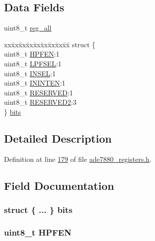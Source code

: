 \subsection*{Data Fields}
\begin{DoxyCompactItemize}
\item 
uint8\-\_\-t \hyperlink{a00023_ab2957613fa7f241407cc98e80676dccf}{reg\-\_\-all}
\item 
\begin{tabbing}
xx\=xx\=xx\=xx\=xx\=xx\=xx\=xx\=xx\=\kill
struct \{\\
\>uint8\_t \hyperlink{a00023_a39a562511dffd499848cfe8bc206364e}{HPFEN}:1\\
\>uint8\_t \hyperlink{a00023_ac6b65abbac3f8c1f93faa0fc9930f999}{LPFSEL}:1\\
\>uint8\_t \hyperlink{a00023_a3780db4512858d880503585a96f823a6}{INSEL}:1\\
\>uint8\_t \hyperlink{a00023_ab585d8beeb312dbb41d7485d5f707368}{ININTEN}:1\\
\>uint8\_t \hyperlink{a00023_ad5d4752b467b6c64a9b5fa14d65c71b2}{RESERVED}:1\\
\>uint8\_t \hyperlink{a00023_acfd75aa5652ddc0497f2463cd9bb9465}{RESERVED2}:3\\
\} \hyperlink{a00023_a2601b50ac55a04745d2da82de638586e}{bits}\\

\end{tabbing}\end{DoxyCompactItemize}


\subsection{Detailed Description}


Definition at line \hyperlink{a00036_source_l00179}{179} of file \hyperlink{a00036_source}{ade7880\-\_\-registers.\-h}.



\subsection{Field Documentation}
\hypertarget{a00023_a2601b50ac55a04745d2da82de638586e}{
\subsubsection[{bits}]{\setlength{\rightskip}{0pt plus 5cm}struct \{ ... \}  bits}}\label{d3/d52/a00023_a2601b50ac55a04745d2da82de638586e}
\hypertarget{a00023_a39a562511dffd499848cfe8bc206364e}{
\subsubsection[{H\-P\-F\-E\-N}]{\setlength{\rightskip}{0pt plus 5cm}uint8\-\_\-t H\-P\-F\-E\-N}}\label{d3/d52/a00023_a39a562511dffd499848cfe8bc206364e}


